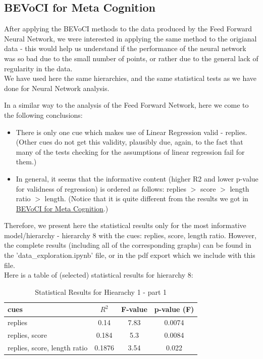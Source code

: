 \documentclass[11pt, oneside]{article}   	%
\begin{document}
\subsection{BEVoCI for Meta Cognition}\label{sec:mc_hlr}
After applying the BEVoCI methods to the data produced by the Feed Forward Neural Network, we were interested in applying the same method to the origianal data - this would help us understand if the performance of the neural network was so bad due to the small number of points, or rather due to the general lack of regularity in the data.\\
We have used here the same hierarchies, and the same statistical tests as we have done for Neural Network analysis.

In a similar way to the analysis of the Feed Forward Network, here we come to the following conclusions:
\begin{itemize}
    \item There is only one cue which makes use of Linear Regression valid - replies. (Other cues do not get this validity, plausibly due, again, to the fact that many of the tests checking for the assumptions of linear regression fail for them.)
    \item In general, it seems that the informative content (higher R2 and lower p-value for validness of regression) is ordered as follows: replies $>$ score $>$ length ratio $>$ length. (Notice that it is quite different from the results we got in \hyperref[sec:ffn_hlr]{BEVoCI for Meta Cognition}.)
\end{itemize}

Therefore, we present here the statistical results only for the most informative model/hierarchy - hierarchy 8 with the cues: replies, score, length ratio. However, the complete results (including all of the corresponding graphs) can be found in the 'data\_exploration.ipynb' file, or in the pdf export which we include with this file.\\

Here is a table of (selected) statistical results for hierarchy 8:
\begin{table}[H]
  \begin{center}
  \begin{tabular}{|l|c|c|c|}
    \hline
    cues & $R^2$ & F-value & p-value (F) \\
    \hline
    replies & 0.14 & 7.83 & 0.0074 \\
    replies, score & 0.184 & 5.3 & 0.0084  \\
    replies, score, length ratio & 0.1876 & 3.54 & 0.022  \\
    \hline
  \end{tabular}
  \caption{Statistical Results for Hiearachy 1 - part 1}
  \end{center}
\end{table}
\end{document}
